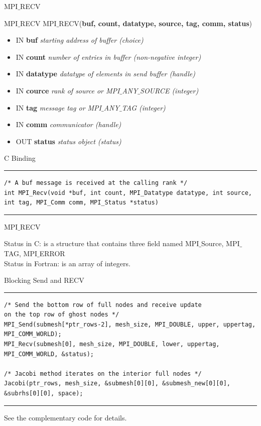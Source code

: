 \documentclass[xcolor=dvipsnames]{beamer}
\begin{document}
\begin{frame}[fragile]{MPI$\_$RECV}
\begin{block}{MPI$\_$RECV}
MPI$\_$RECV(\textbf{buf, count, datatype, source, tag, comm, status})
\\
\begin{itemize}
\item[] IN \textbf{buf} \: \textit{starting address of buffer (choice)}\\
\item[] IN \textbf{count} \: \textit{number of entries in buffer (non-negative integer)}\\
\item[] IN \textbf{datatype} \: \textit{datatype of elements in send buffer (handle)}\\
\item[] IN \textbf{cource} \: \textit{rank of source or MPI$\_$ANY$\_$SOURCE (integer)}\\
\item[] IN \textbf{tag} \: \textit{message tag or MPI$\_$ANY$\_$TAG (integer)}\\
\item[] IN \textbf{comm} \: \textit{communicator (handle)}\\
\item[] OUT \textbf{status} \: \textit{status object (status)}
\end{itemize}
\end{block}

C Binding
\rule{\textwidth}{1pt}
\scriptsize
\begin{verbatim}
/* A buf message is received at the calling rank */
int MPI_Recv(void *buf, int count, MPI_Datatype datatype, int source, 
int tag, MPI_Comm comm, MPI_Status *status)
\end{verbatim}
\rule{\textwidth}{1pt}
\end{frame}


\begin{frame}{MPI$\_$RECV}
\begin{outline}
\1 Status in C: is a structure that contains three field named MPI$\_$Source, MPI$\_$TAG, MPI$\_$ERROR\\
\1 Status in Fortran: is an array of integers.
\end{outline}
\end{frame}


\begin{frame}[fragile]{Blocking Send and RECV}
\rule{\textwidth}{1pt}
\scriptsize
\begin{verbatim}
/* Send the bottom row of full nodes and receive update 
on the top row of ghost nodes */
MPI_Send(submesh[*ptr_rows-2], mesh_size, MPI_DOUBLE, upper, uppertag, 
MPI_COMM_WORLD);
MPI_Recv(submesh[0], mesh_size, MPI_DOUBLE, lower, uppertag,
MPI_COMM_WORLD, &status);

/* Jacobi method iterates on the interior full nodes */
Jacobi(ptr_rows, mesh_size, &submesh[0][0], &submesh_new[0][0],
&subrhs[0][0], space);

\end{verbatim}
\rule{\textwidth}{1pt}
See the complementary code for details.
\end{frame}
\end{document}
